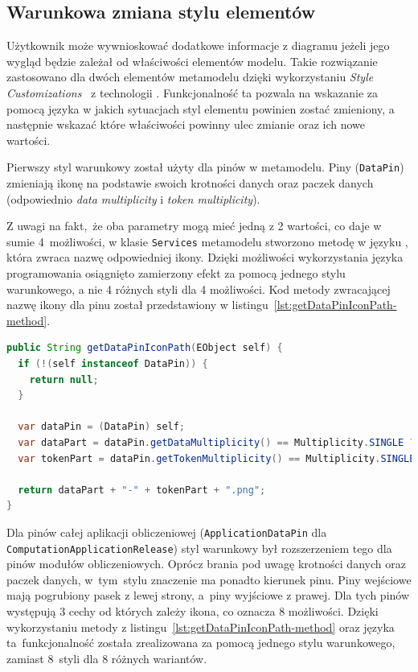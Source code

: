 \subsection{Warunkowa zmiana stylu elementów}

Użytkownik może wywnioskować dodatkowe informacje z diagramu jeżeli jego wygląd
będzie zależał od właściwości elementów modelu. Takie rozwiązanie zastosowano
dla dwóch elementów metamodelu dzięki wykorzystaniu \emph{Style
	Customizations}~\cite{sirius-desktop-documentation-style-customizations}
z technologii \EMF{}.
Funkcjonalność ta pozwala na wskazanie za pomocą języka \AQL{} w jakich
sytuacjach styl elementu powinien zostać zmieniony, a następnie wskazać które
właściwości powinny ulec zmianie oraz ich nowe wartości.

Pierwszy styl warunkowy został użyty dla pinów w metamodelu. Piny
(\texttt{DataPin}) zmieniają ikonę na podstawie swoich krotności danych oraz
paczek danych (odpowiednio \emph{data multiplicity} i \emph{token
	multiplicity}).

Z uwagi na fakt, że oba parametry mogą mieć jedną z 2 wartości,
co daje w sumie 4~możliwości, w klasie \texttt{Services} metamodelu stworzono
metodę w języku \Java{}, która zwraca nazwę odpowiedniej ikony.
Dzięki możliwości wykorzystania języka programowania osiągnięto
zamierzony efekt za pomocą jednego stylu warunkowego, a nie 4 różnych
styli dla 4 możliwości. Kod metody zwracającej nazwę ikony dla pinu
został przedstawiony w listingu~\ref{lst:getDataPinIconPath-method}.

\begin{lstlisting}[float,
    floatplacement=ht,
    language=Java,
    caption={Metoda zwracająca nazwę ikony dla pinu},
    label={lst:getDataPinIconPath-method}]
public String getDataPinIconPath(EObject self) {
  if (!(self instanceof DataPin)) {
    return null;
  }

  var dataPin = (DataPin) self;
  var dataPart = dataPin.getDataMultiplicity() == Multiplicity.SINGLE ? "single-data" : "multiple-data";
  var tokenPart = dataPin.getTokenMultiplicity() == Multiplicity.SINGLE ? "single-token" : "multiple-tokens";

  return dataPart + "-" + tokenPart + ".png";
}
\end{lstlisting}

Dla pinów całej aplikacji obliczeniowej (\texttt{Application\-Data\-Pin} dla
\texttt{Computation\-Application\-Release}) styl warunkowy był
rozszerzeniem tego
dla pinów modułów obliczeniowych. Oprócz brania pod uwagę krotności danych
oraz
paczek danych, w~tym~stylu znaczenie ma ponadto kierunek pinu. Piny wejściowe
mają pogrubiony pasek z lewej strony, a~piny wyjściowe z prawej. Dla tych
pinów występują 3 cechy od których zależy ikona, co oznacza 8 możliwości.
Dzięki wykorzystaniu metody z listingu~\ref{lst:getDataPinIconPath-method} oraz
języka \AQL{} ta~funkcjonalność została zrealizowana za pomocą jednego stylu
warunkowego, zamiast 8~styli dla 8 różnych wariantów.

